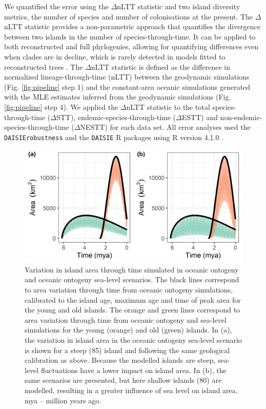 \documentclass{article}
\begin{document}
We quantified the error using the $\Delta$nLTT statistic \citep{janzen_approximate_2015} and two island diversity metrics, the number of species and number of colonisations at the present. The $\Delta$nLTT statistic provides a non-parametric approach that quantifies the divergence between two islands in the number of species-through-time. It can be applied to both reconstructed and full phylogenies, allowing for quantifying differences even when clades are in decline, which is rarely detected in models fitted to reconstructed trees \citep{burin_how_2019}. The $\Delta$nLTT statistic is defined as the difference in normalized lineage-through-time (nLTT) between the geodynamic simulations (Fig. \ref{fig:pipeline} step 1) and the constant-area oceanic simulations generated with the MLE estimates inferred from the geodynamic simulations (Fig. \ref{fig:pipeline} step 4). We applied the $\Delta$nLTT statistic to the total species-through-time ($\Delta$STT), endemic-species-through-time ($\Delta$ESTT) and non-endemic-species-through-time ($\Delta$NESTT) for each data set. All error analyses used the \texttt{DAISIErobustness} \citep{lambert_joshua_w_2021_5119973}  and the \texttt{DAISIE} \citep{etienne_daisie_2021} R packages using R version 4.1.0 \citep{r_2021}.

\clearpage

\begin{figure}
    \centering
    \includegraphics[width=\textwidth]{area.png}
    \caption{Variation in island area through time simulated in oceanic ontogeny and oceanic ontogeny sea-level scenarios. The black lines correspond to area variation through time from oceanic ontogeny simulations, calibrated to the island age, maximum age and time of peak area for the young and old islands. The orange and green lines correspond to area variation through time from oceanic ontogeny and sea-level simulations for the young (orange) and old (green) islands. In (a), the variation in island area in the oceanic ontogeny sea-level scenario is shown for a steep (85\degree) island and following the same geological calibration as above. Because the modelled islands are steep, sea-level fluctuations have a lower impact on island area. In (b), the same scenarios are presented, but here shallow islands (80\degree) are modelled, resulting in a greater influence of sea level on island area. mya – million years ago.}
    \label{fig:area}
\end{figure}
\end{document}

